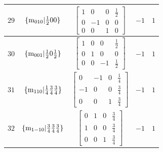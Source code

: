 \documentclass[fleqn,8pt]{jsarticle}
\begin{document}
\begin{longtable}{ccccc}
$ 29 $ & $ \{{\rm m}_{010}|\frac{1}{2} 0 0\} $ & $ \begin{bmatrix} 1 & 0 & 0 & \frac{1}{2} \\ 0 & -1 & 0 & 0 \\ 0 & 0 & 1 & 0 \end{bmatrix} $ & $ -1 $ & $ 1 $ \\ \hline
$ 30 $ & $ \{{\rm m}_{001}|\frac{1}{2} 0 \frac{1}{2}\} $ & $ \begin{bmatrix} 1 & 0 & 0 & \frac{1}{2} \\ 0 & 1 & 0 & 0 \\ 0 & 0 & -1 & \frac{1}{2} \end{bmatrix} $ & $ -1 $ & $ 1 $ \\ \hline
$ 31 $ & $ \{{\rm m}_{110}|\frac{1}{4} \frac{3}{4} \frac{3}{4}\} $ & $ \begin{bmatrix} 0 & -1 & 0 & \frac{1}{4} \\ -1 & 0 & 0 & \frac{3}{4} \\ 0 & 0 & 1 & \frac{3}{4} \end{bmatrix} $ & $ -1 $ & $ 1 $ \\ \hline
$ 32 $ & $ \{{\rm m}_{1-10}|\frac{3}{4} \frac{3}{4} \frac{3}{4}\} $ & $ \begin{bmatrix} 0 & 1 & 0 & \frac{3}{4} \\ 1 & 0 & 0 & \frac{3}{4} \\ 0 & 0 & 1 & \frac{3}{4} \end{bmatrix} $ & $ -1 $ & $ 1 $ \\
\end{longtable}
\end{document}
